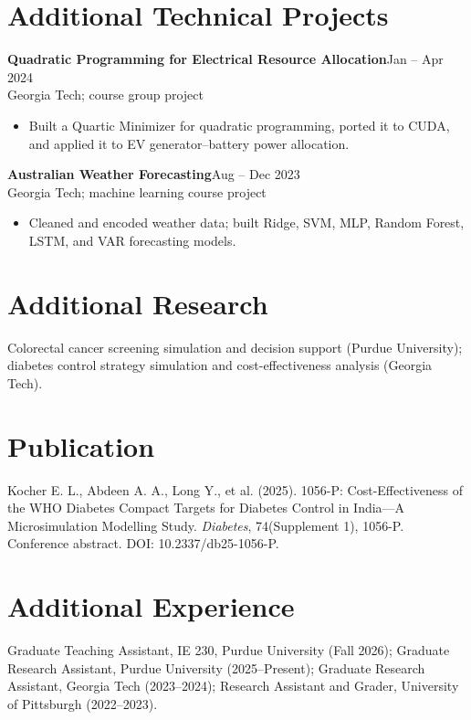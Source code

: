 \documentclass[letterpaper,10pt]{article}
\newcommand{\job}[3]{\textbf{#1}\hfill #2\\{\small #3}\par}
\begin{document}
\section{Additional Technical Projects}
\job{Quadratic Programming for Electrical Resource Allocation}{Jan -- Apr 2024}{Georgia Tech; course group project}
\begin{itemize}
\item Built a Quartic Minimizer for quadratic programming, ported it to CUDA, and applied it to EV generator--battery power allocation.
\end{itemize}
\job{Australian Weather Forecasting}{Aug -- Dec 2023}{Georgia Tech; machine learning course project}
\begin{itemize}
\item Cleaned and encoded weather data; built Ridge, SVM, MLP, Random Forest, LSTM, and VAR forecasting models.
\end{itemize}
\section{Additional Research}
Colorectal cancer screening simulation and decision support (Purdue University); diabetes control strategy simulation and cost-effectiveness analysis (Georgia Tech).
\section{Publication}
Kocher E. L., Abdeen A. A., Long Y., et al. (2025). 1056-P: Cost-Effectiveness of the WHO Diabetes Compact Targets for Diabetes Control in India---A Microsimulation Modelling Study. \textit{Diabetes}, 74(Supplement 1), 1056-P. Conference abstract. DOI: 10.2337/db25-1056-P.
\section{Additional Experience}
Graduate Teaching Assistant, IE 230, Purdue University (Fall 2026); Graduate Research Assistant, Purdue University (2025--Present); Graduate Research Assistant, Georgia Tech (2023--2024); Research Assistant and Grader, University of Pittsburgh (2022--2023).
\end{document}
